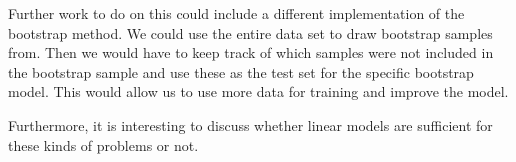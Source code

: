 Further work to do on this could include a different implementation of the bootstrap method. We could use the entire data set to draw bootstrap samples from. Then we would have to keep track of which samples were not included in the bootstrap sample and use these as the test set for the specific bootstrap model. This would allow us to use more data for training and improve the model. 

Furthermore, it is interesting to discuss whether linear models are sufficient for these kinds of problems or not. 

